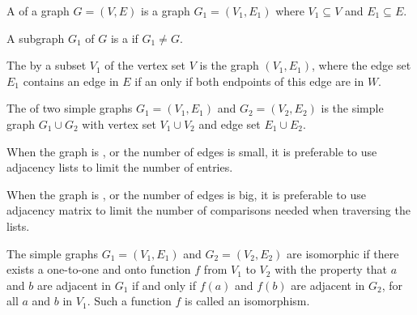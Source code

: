             \par A  of a graph $G = (V, E)$ is a graph $G_{1} = (V_{1}, E_{1})$ where
                $V_{1} \subseteq V$ and $E_{1} \subseteq E$.
            \par A subgraph $G_{1}$ of $G$ is a  if $G_{1} \neq G$.
            \par The  by a subset $V_{1}$ of the vertex set $V$ is the graph
                $(V_{1}, E_{1})$, where the edge set $E_{1}$ contains an edge in $E$ if an only if
                both endpoints of this edge are in $W$.
            \par The  of two simple graphs $G_{1} = (V_{1}, E_{1})$ and
                $G_{2} = (V_{2}, E_{2})$ is the simple graph $G_{1} \cup G_{2}$ with vertex set
                $V_{1} \cup V_{2}$ and edge set $E_{1} \cup E_{2}$.
    \hiiEND

    

        \par When the graph is , or the number of edges is small, it is preferable
        to use adjacency lists to limit the number of entries.
        \par When the graph is , or the number of edges is big, it is preferable to
        use adjacency matrix to limit the number of comparisons needed when traversing the lists.


        \par The simple graphs $G_{1} = (V_{1}, E_{1})$ and $G_{2} = (V_{2}, E_{2})$ are isomorphic
        if there exists a one-to-one and onto function $f$ from $V_{1}$ to $V_{2}$ with the property
        that $a$ and $b$ are adjacent in $G_{1}$ if and only if $f(a)$ and $f(b)$ are adjacent in
        $G_{2}$, for all $a$ and $b$ in $V_{1}$. Such a function $f$ is called an isomorphism.

